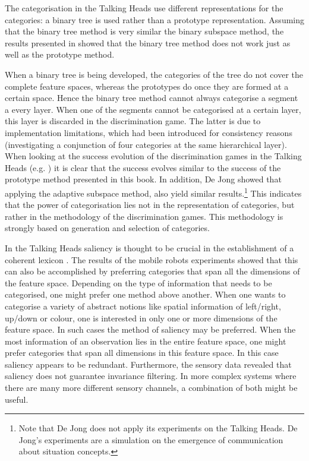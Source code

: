 The categorisation in the Talking Heads use different representations for the categories: a binary tree is used rather than a prototype representation. Assuming that the binary tree method is very similar the binary subspace method, the results presented in  showed that the binary tree method does not work just as well as the prototype method.

When a binary tree is being developed, the categories of the tree do not cover the complete feature spaces, whereas the prototypes do once they are formed at a certain space. Hence the binary tree method cannot always categorise a segment a every layer. When one of the segments cannot be categorised at a certain layer, this layer is discarded in the discrimination game. The latter is due to implementation limitations, which had been introduced for consistency reasons (investigating a conjunction of four categories at the same hierarchical layer). When looking at the success evolution of the discrimination games in the Talking Heads (e.g. \citealt{steels:2000}) it is clear that the success evolves similar to the success of the prototype method presented in this book. In addition, De Jong \citep{dejongvogt:1998,dejong:2000} showed that applying  the {\sc adaptive subspace method}, also yield similar results.\footnote{Note that De Jong does not apply its experiments on the Talking Heads. De Jong's experiments are a simulation on the emergence of communication about {\sc situation concepts}.} This indicates that the power of categorisation lies not in the representation of categories, but rather in the methodology of the discrimination games. This methodology is strongly based on generation and selection of categories.


In the Talking Heads saliency is thought to be crucial in the establishment of a coherent lexicon \citep{steels:2000}. The results of the mobile robots experiments showed that this can also be accomplished by preferring categories that span all the dimensions of the feature space. Depending on the type of information that needs to be categorised, one might prefer one method above another. When one wants to categorise a variety of abstract notions like spatial information of left/right, up/down or colour, one is interested in only one or more dimensions of the feature space. In such cases the method of saliency may be preferred. When the most information of an observation lies in the entire feature space, one might prefer categories that span all dimensions in this feature space. In this case saliency appears to be redundant. Furthermore, the sensory data revealed that saliency does not guarantee invariance filtering. In more complex systems where there are many more different sensory channels, a combination of both might be useful.



